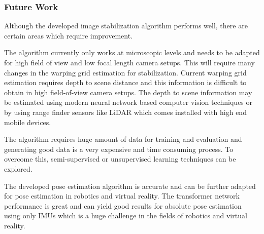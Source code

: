 \subsubsection{Future Work}
Although the developed image stabilization algorithm performs well, there are certain areas which require improvement. 

The algorithm currently only works at microscopic levels and needs to be adapted for high field of view and low focal length camera setups. This will require many changes in the warping grid estimation for stabilization. Current warping grid estimation requires depth to scene distance and this information is difficult to obtain in high field-of-view camera setups. The depth to scene information may be estimated using modern neural network based computer vision techniques or by using range finder sensors like LiDAR which comes installed with high end mobile devices.

The algorithm requires huge amount of data for training and evaluation and generating good data is a very expensive and time consuming process. To overcome this, semi-supervised or unsupervised learning techniques can be explored.

The developed pose estimation algorithm is accurate and can be further adapted for pose estimation in robotics and virtual reality. The transformer network performance is great and can yield good results for absolute pose estimation using only IMUs which is a huge challenge in the fields of robotics and virtual reality.